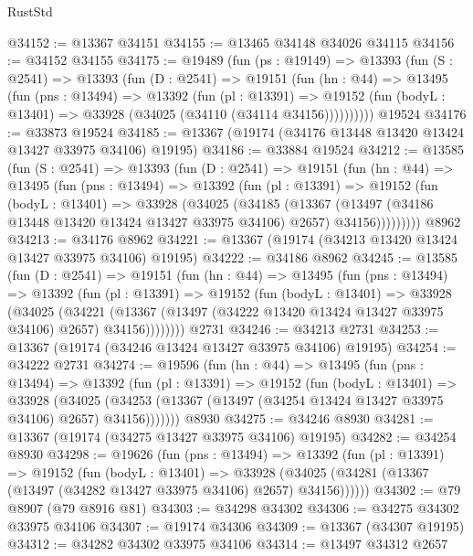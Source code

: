 \begin{lexlean}{RustStd}
\begin{coremodule}
@34152 := @13367 @34151
@34155 := @13465 @34148 @34026 @34115
@34156 := @34152 @34155
@34175 := @19489
    (fun (ps : @19149) =>
    @13393
      (fun (S : @2541) =>
      @13393
        (fun (D : @2541) =>
        @19151
          (fun (hn : @44) =>
          @13495
            (fun (pns : @13494) =>
            @13392
              (fun (pl : @13391) =>
              @19152 (fun (bodyL : @13401) => @33928 (@34025 (@34110 (@34114 @34156))))))))))
    @19524
@34176 := @33873 @19524
@34185 := @13367 (@19174 (@34176 @13448 @13420 @13424 @13427 @33975 @34106) @19195)
@34186 := @33884 @19524
@34212 := @13585
    (fun (S : @2541) =>
    @13393
      (fun (D : @2541) =>
      @19151
        (fun (hn : @44) =>
        @13495
          (fun (pns : @13494) =>
          @13392
            (fun (pl : @13391) =>
            @19152
              (fun (bodyL : @13401) =>
              @33928
                (@34025
                  (@34185
                    (@13367
                      (@13497 (@34186 @13448 @13420 @13424 @13427 @33975 @34106) @2657)
                      @34156)))))))))
    @8962
@34213 := @34176 @8962
@34221 := @13367 (@19174 (@34213 @13420 @13424 @13427 @33975 @34106) @19195)
@34222 := @34186 @8962
@34245 := @13585
    (fun (D : @2541) =>
    @19151
      (fun (hn : @44) =>
      @13495
        (fun (pns : @13494) =>
        @13392
          (fun (pl : @13391) =>
          @19152
            (fun (bodyL : @13401) =>
            @33928
              (@34025
                (@34221
                  (@13367 (@13497 (@34222 @13420 @13424 @13427 @33975 @34106) @2657) @34156))))))))
    @2731
@34246 := @34213 @2731
@34253 := @13367 (@19174 (@34246 @13424 @13427 @33975 @34106) @19195)
@34254 := @34222 @2731
@34274 := @19596
    (fun (hn : @44) =>
    @13495
      (fun (pns : @13494) =>
      @13392
        (fun (pl : @13391) =>
        @19152
          (fun (bodyL : @13401) =>
          @33928
            (@34025
              (@34253 (@13367 (@13497 (@34254 @13424 @13427 @33975 @34106) @2657) @34156)))))))
    @8930
@34275 := @34246 @8930
@34281 := @13367 (@19174 (@34275 @13427 @33975 @34106) @19195)
@34282 := @34254 @8930
@34298 := @19626
    (fun (pns : @13494) =>
    @13392
      (fun (pl : @13391) =>
      @19152
        (fun (bodyL : @13401) =>
        @33928 (@34025 (@34281 (@13367 (@13497 (@34282 @13427 @33975 @34106) @2657) @34156))))))
@34302 := @79 @8907 (@79 @8916 @81)
@34303 := @34298 @34302
@34306 := @34275 @34302 @33975 @34106
@34307 := @19174 @34306
@34309 := @13367 (@34307 @19195)
@34312 := @34282 @34302 @33975 @34106
@34314 := @13497 @34312 @2657

\end{coremodule}
\end{lexlean}
